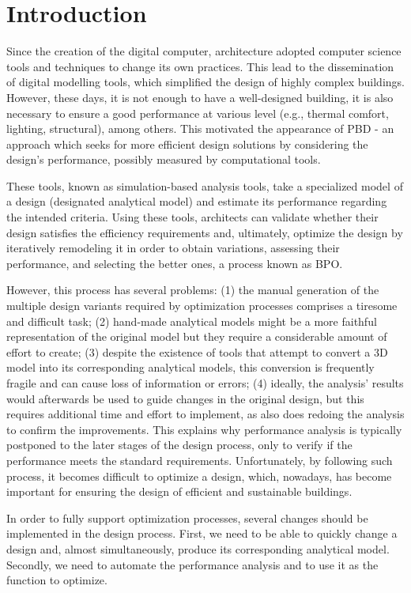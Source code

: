 \section{Introduction}
\label{sec:intro}
	
	Since the creation of the digital computer, architecture adopted computer science tools and techniques to change its own practices. This lead to the dissemination of digital modelling tools, which simplified the design of highly complex buildings. However, these days, it is not enough to have a well-designed building, it is also necessary to ensure a good performance at various level (e.g., thermal comfort, lighting, structural), among others. This motivated the appearance of \ac{PBD} - an approach which seeks for more efficient design solutions by considering the design's performance, possibly measured by computational tools. 
	
	These tools, known as simulation-based analysis tools, take a specialized model of a design (designated analytical model) and estimate its performance regarding the intended criteria. Using these tools, architects can validate whether their design satisfies the efficiency requirements and, ultimately, optimize the design by iteratively remodeling it in order to obtain variations, assessing their performance, and selecting the better ones, a process known as \ac{BPO}.
	
	However, this process has several problems: (1) the manual generation of the multiple design variants required by optimization processes comprises a tiresome and difficult task; (2) hand-made analytical models might be a more faithful representation of the original model but they require a considerable amount of effort to create; (3) despite the existence of tools that attempt to convert a 3D model into its corresponding analytical models, this conversion is frequently fragile and can cause loss of information or errors; (4) ideally, the analysis' results would afterwards be used to guide changes in the original design, but this requires additional time and effort to implement, as also does redoing the analysis to confirm the improvements. This explains why performance analysis is typically postponed to the later stages of the design process, only to verify if the performance meets the standard requirements. Unfortunately, by following such process, it becomes difficult to optimize a design, which, nowadays, has become important for ensuring the design of efficient and sustainable buildings.
	
	In order to fully support optimization processes, several changes should be implemented in the design process. First, we need to be able to quickly change a design and, almost simultaneously, produce its corresponding analytical model. Secondly, we need to automate the performance analysis and to use it as the function to optimize.
	
